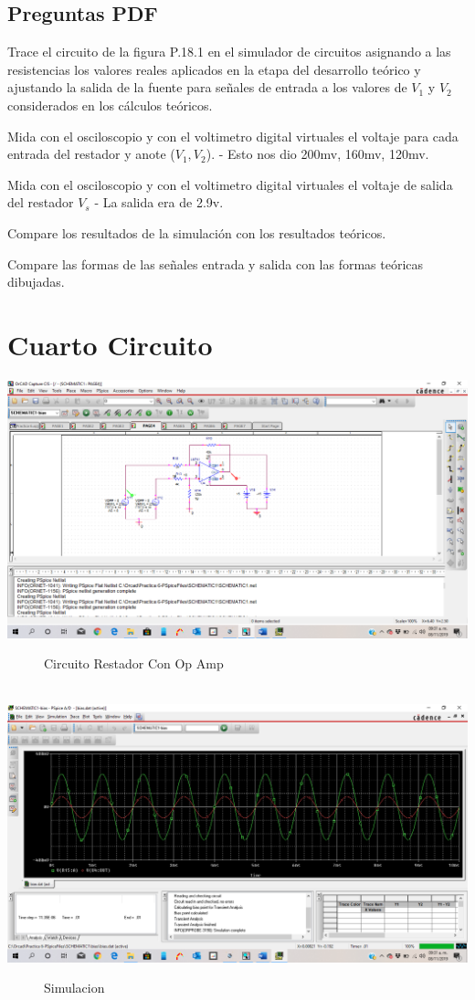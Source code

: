 \documentclass[10pt,a4paper]{article}
\begin{document}
\subsection{Preguntas PDF}

Trace el circuito de la figura P.18.1 en el simulador de circuitos asignando a las resistencias los valores reales aplicados en la etapa del desarrollo teórico y ajustando la salida de la fuente para señales de entrada a los valores de $ V_1 $ y $V_2$ considerados en los cálculos teóricos.

Mida con el osciloscopio y con el voltimetro digital virtuales el voltaje para cada entrada del restador y anote ($V_1, V_2$). - Esto nos dio 200mv, 160mv, 120mv.

Mida con el osciloscopio y con el voltimetro digital virtuales el voltaje de salida del restador $V_s$ - La salida era de 2.9v.

Compare los resultados de la simulación con los resultados teóricos.

Compare las formas de las señales entrada y salida con las formas teóricas dibujadas.

\section{Cuarto Circuito}
\begin{center}
 \includegraphics[scale=0.2]{7.png}
 \begin{figure}[hbtp]
 \caption{Circuito Restador Con Op Amp}
 \centering
 \end{figure}\\
  \includegraphics[scale=0.2]{8.png}
 \begin{figure}[hbtp]
 \caption{Simulacion}
 \centering
 \end{figure} 
\end{center}
\end{document}
